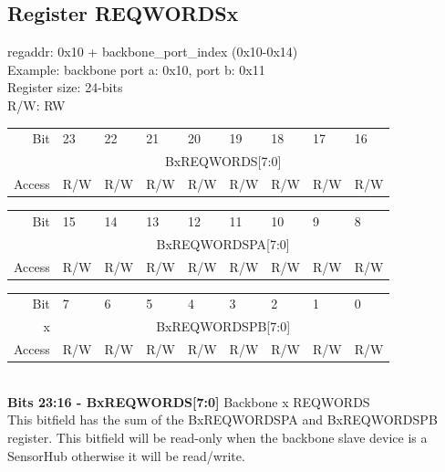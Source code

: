 \subsection{Register REQWORDSx}
regaddr: 0x10 + backbone\_port\_index (0x10-0x14)\\
Example: backbone port a: 0x10, port b: 0x11\\
Register size: 24-bits\\
R/W: RW\\
\begin{table}[h!]
    \centering
\begin{tabular}{rp{1.25cm}p{1.25cm}p{1.25cm}p{1.25cm}p{1.25cm}p{1.25cm}p{1.25cm}p{1.25cm}}
Bit &
  23 &
  22 &
  21 &
  20 &
  19 &
  18 &
  17 &
  16 \\ \cline{2-9} 
\multicolumn{1}{r|}{} &
 \multicolumn{8}{c|}{\scriptsize{BxREQWORDS[7:0]}} \\\cline{2-9} 
Access &
  R/W &
  R/W &
  R/W &
  R/W &
  R/W &
  R/W &
  R/W &
  R/W 
\end{tabular}
\begin{tabular}{rp{1.25cm}p{1.25cm}p{1.25cm}p{1.25cm}p{1.25cm}p{1.25cm}p{1.25cm}p{1.25cm}}
Bit &
  15 &
  14 &
  13 &
  12 &
  11 &
  10 &
  9 &
  8 \\ \cline{2-9} 
\multicolumn{1}{r|}{} &
  \multicolumn{8}{c|}{\scriptsize{BxREQWORDSPA[7:0]}}  \\\cline{2-9} 
Access &
  R/W &
  R/W &
  R/W &
  R/W &
  R/W &
  R/W &
  R/W &
  R/W 
\end{tabular}

\begin{tabular}{rp{1.25cm}p{1.25cm}p{1.25cm}p{1.25cm}p{1.25cm}p{1.25cm}p{1.25cm}p{1.25cm}}
Bit &
  7 &
  6 &
  5 &
  4 &
  3 &
  2 &
  1 &
  0 \\ \cline{2-9} 

\multicolumn{1}{r|}{x} &
  \multicolumn{8}{c|}{\scriptsize{BxREQWORDSPB[7:0]}}  \\\cline{2-9} 
  
Access &
  R/W &
  R/W &
  R/W &
  R/W &
  R/W &
  R/W &
  R/W &
  R/W 
\end{tabular}
\end{table}\\
\textbf{Bits 23:16 - BxREQWORDS[7:0]} Backbone x REQWORDS\\
This bitfield has the sum of the BxREQWORDSPA and BxREQWORDSPB register. This bitfield will be read-only when the backbone slave device is a SensorHub otherwise it will be read/write.\\\\
